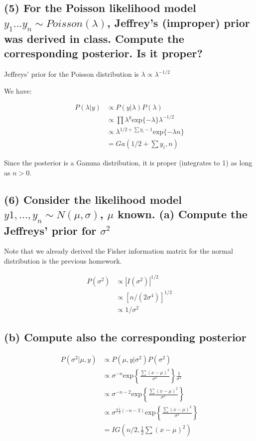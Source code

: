 \documentclass[11pt]{article}
\begin{document}
\subsection*{(5) For the Poisson likelihood model $y_1\ldots y_n
 \sim Poisson(\lambda)$, Jeffrey’s (improper) prior was derived in class. Compute the corresponding posterior. Is it proper?}

Jeffreys' prior for the Poisson distribution is $\lambda \propto \lambda^{-1/2}$

We have:

\begin{align*}
    P(\lambda|y) &\propto P(y|\lambda)P(\lambda)\\
    &\propto \prod \lambda^y\text{exp}\{-\lambda\}\lambda^{-1/2}\\
    &\propto  \lambda^{1/2 + \sum y_i - 1} \text{exp}\{-\lambda n\}\\
    &= Ga\left(1/2 + \sum y_i, n \right)
    \end{align*}
    
Since the posterior is a Gamma distribution, it is proper (integrates to 1) as long as $n > 0$.

\subsection*{(6)  Consider the likelihood model$ y1, \ldots , y_n \sim N(\mu, \sigma)$, $\mu$ known. (a) Compute the Jeffreys’ prior for $\sigma^2$ }
Note that we already derived the Fisher information matrix for the normal distribution is the previous homework.

\begin{align*}
    P(\sigma^2) &\propto |I(\sigma^2)|^{1/2}\\
    &\propto [n/(2\sigma^4)]^{1/2}\\
    &\propto 1/\sigma^2
\end{align*}

\subsection*{(b) Compute also the corresponding posterior}

\begin{align*}
    P(\sigma^2|\mu, y) &\propto P(\mu, y|\sigma^2)P(\sigma^2)\\
    &\propto  \sigma^{-n}\text{exp}\left \{ \frac{\sum(x-\mu)^2}{\sigma^2}\right \} \frac{1}{\sigma^2}\\
    &\propto  \sigma^{-n-2}\text{exp}\left \{ \frac{\sum(x-\mu)^2}{\sigma^2}\right \} \\
     &\propto  \sigma^{2\frac{1}{2}{(-n-2)}}\text{exp}\left \{ \frac{\sum(x-\mu)^2}{\sigma^2}\right \} \\
     &= IG\left(n/2, \frac{1}{2}\sum(x-\mu)^2\right) 
\end{align*}
\end{document}

